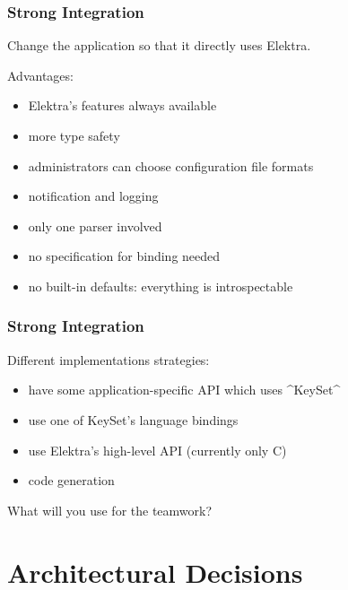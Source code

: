 \begin{frame}[fragile]
	\frametitle{Strong Integration}

	Change the application so that it directly uses Elektra.

	Advantages:
	\begin{itemize}[<+-| alert@+>]
	\item Elektra's features always available
	\item more type safety
	\item administrators can choose configuration file formats
	\item notification and logging
	\item only one parser involved
	\item no specification for binding needed
	\item no built-in defaults: everything is introspectable
	\end{itemize}
\end{frame}

\begin{frame}[fragile]
	\frametitle{Strong Integration}

	Different implementations strategies:

	\begin{itemize}[<+-| alert@+>]
	\item have some application-specific API which uses ^KeySet^
	\item use one of KeySet's language bindings
	\item use Elektra's high-level API (currently only C)
	\item code generation
	\end{itemize}
\end{frame}

\begin{assignment}
	\begin{task}
	What will you use for the teamwork?
	\end{task}
\end{assignment}




\section{Architectural Decisions}

\subsection{}

